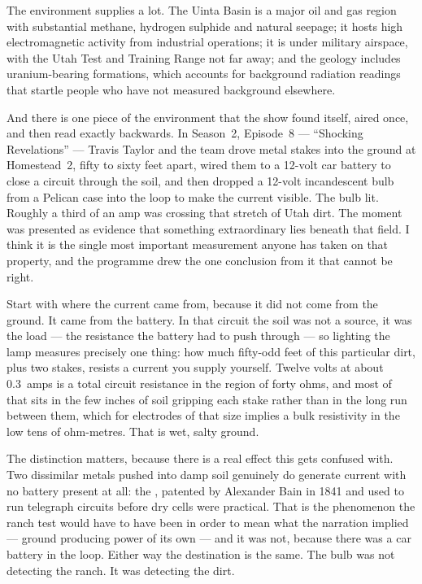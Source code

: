 The environment supplies a lot. The Uinta Basin is a major oil and gas region with substantial
methane, hydrogen sulphide and natural seepage; it hosts high electromagnetic activity from
industrial operations; it is under military airspace, with the Utah Test and Training Range not
far away; and the geology includes uranium-bearing formations, which accounts for background
radiation readings that startle people who have not measured background elsewhere. 

And there is one piece of the environment that the show found itself, aired once, and then read
exactly backwards. In Season~2, Episode~8 --- ``Shocking Revelations'' --- Travis Taylor and the
team drove metal stakes into the ground at Homestead~2, fifty to sixty feet apart, wired them to a
12-volt car battery to close a circuit through the soil, and then dropped a 12-volt incandescent
bulb from a Pelican case into the loop to make the current visible. The bulb lit. Roughly a third
of an amp was crossing that stretch of Utah dirt. The moment was presented as evidence that
something extraordinary lies beneath that field. I think it is the single most important
measurement anyone has taken on that property, and the programme drew the one conclusion from it
that cannot be right.

Start with where the current came from, because it did not come from the ground. It came from the
battery. In that circuit the soil was not a source, it was the load --- the resistance the battery
had to push through --- so lighting the lamp measures precisely one thing: how much fifty-odd feet
of this particular dirt, plus two stakes, resists a current you supply yourself. Twelve volts at
about 0.3~amps is a total circuit resistance in the region of forty ohms, and most of that sits in
the few inches of soil gripping each stake rather than in the long run between them, which for
electrodes of that size implies a bulk resistivity in the low tens of ohm-metres. That is wet,
salty ground. 

The distinction matters, because there is a real effect this gets confused with. Two dissimilar
metals pushed into damp soil genuinely do generate current with no battery present at all: the
, patented by Alexander Bain in 1841 and used to run telegraph circuits before
dry cells were practical. That is the phenomenon the ranch test would have to have been in order to
mean what the narration implied --- ground producing power of its own --- and it was not, because
there was a car battery in the loop. Either way the destination is the same. The bulb was not
detecting the ranch. It was detecting the dirt.

